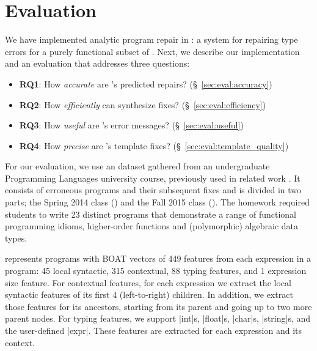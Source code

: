 \section{Evaluation}
\label{sec:eval}

\lstMakeShortInline[mathescape=true]{|}

We have implemented analytic program repair in \toolname: a system for
repairing type errors for a purely functional subset of \ocaml. Next,
we describe our implementation and an evaluation that addresses three
questions:

\begin{itemize}
    \item \textbf{RQ1}: How \emph{accurate} are \toolname's predicted repairs?
                        (\S~\ref{sec:eval:accuracy})
    \item \textbf{RQ2}: How \emph{efficiently} can \toolname synthesize fixes?
                        (\S~\ref{sec:eval:efficiency})
    \item \textbf{RQ3}: How \emph{useful} are \toolname's error messages?
                        (\S~\ref{sec:eval:useful})
    \item \textbf{RQ4}: How \emph{precise} are \toolname's template fixes?
                        (\S~\ref{sec:eval:template_quality})

\end{itemize}


%
For our evaluation, we use an \ocaml dataset gathered from an undergraduate
Programming Languages university course, previously used in related work
\citep{Seidel2017-ko,Seidel:2017}. It consists of erroneous programs and their
subsequent fixes and is divided in two parts; the Spring 2014 class (\SPRING)
and the Fall 2015 class (\FALL). The homework required students to write 23
distinct programs that demonstrate a range of functional programming idioms, \eg
higher-order functions and (polymorphic) algebraic data types.

%
\toolname represents programs with BOAT vectors of 449 features from each
expression in a program: 45 local syntactic, 315 contextual, 88 typing features,
and 1 expression size feature. For contextual features, for each expression we
extract the local syntactic features of its first 4 (left-to-right) children. In
addition, we extract those features for its ancestors, starting from its parent
and going up to two more parent nodes. For typing features, we support |int|s,
|float|s, |char|s, |string|s, and the user-defined |expr|. These features are
extracted for each expression and its context.

